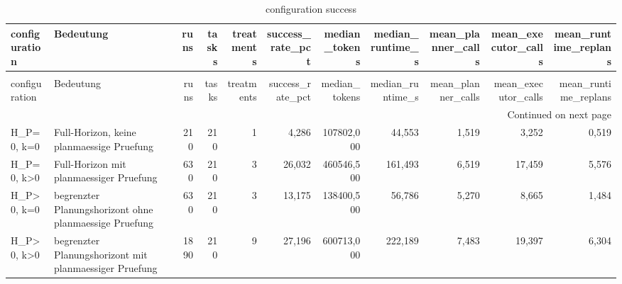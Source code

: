 \begin{longtable}{llrrrrrrrrr}
\caption{configuration success} \label{tab:configuration_success} \\
\toprule
configuration & Bedeutung & runs & tasks & treatments & success\_rate\_pct & median\_tokens & median\_runtime\_s & mean\_planner\_calls & mean\_executor\_calls & mean\_runtime\_replans \\
\midrule
\endfirsthead
\caption[]{configuration success} \\
\toprule
configuration & Bedeutung & runs & tasks & treatments & success\_rate\_pct & median\_tokens & median\_runtime\_s & mean\_planner\_calls & mean\_executor\_calls & mean\_runtime\_replans \\
\midrule
\endhead
\midrule
\multicolumn{11}{r}{Continued on next page} \\
\midrule
\endfoot
\bottomrule
\endlastfoot
H\_P=0, k=0 & Full-Horizon, keine planmaessige Pruefung & 210 & 210 & 1 & 4,286 & 107802,000 & 44,553 & 1,519 & 3,252 & 0,519 \\
H\_P=0, k>0 & Full-Horizon mit planmaessiger Pruefung & 630 & 210 & 3 & 26,032 & 460546,500 & 161,493 & 6,519 & 17,459 & 5,576 \\
H\_P>0, k=0 & begrenzter Planungshorizont ohne planmaessige Pruefung & 630 & 210 & 3 & 13,175 & 138400,500 & 56,786 & 5,270 & 8,665 & 1,484 \\
H\_P>0, k>0 & begrenzter Planungshorizont mit planmaessiger Pruefung & 1890 & 210 & 9 & 27,196 & 600713,000 & 222,189 & 7,483 & 19,397 & 6,304 \\
\end{longtable}
